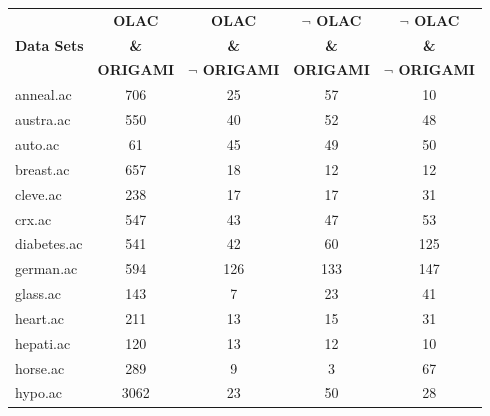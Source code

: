 \begin{table}[htbp]
	\centering
		\begin{tabular}{|l|c|c|c|c|}
		\hline
				& \textbf{OLAC}		& \textbf{OLAC}			& \textbf{$\neg$ OLAC}	& \textbf{$\neg$ OLAC}	\\
		\textbf{Data Sets}	& \textbf{\&}		& \textbf{\&}			& \textbf{\&}			& \textbf{\&}			\\
				& \textbf{ORIGAMI}	& \textbf{$\neg$ ORIGAMI}	& \textbf{ORIGAMI}		& \textbf{$\neg$ ORIGAMI}	\\
		\hline
		anneal.ac       & 706           & 25                 & 57                       & 10                            \\
		\hline
		austra.ac       & 550           & 40                 & 52                       & 48                            \\
		\hline
		auto.ac         & 61            & 45                 & 49                       & 50                            \\
		\hline
		breast.ac       & 657           & 18                 & 12                       & 12                            \\
		\hline
		cleve.ac        & 238           & 17                 & 17                       & 31                            \\
		\hline
		crx.ac          & 547           & 43                 & 47                       & 53                            \\
		\hline
		diabetes.ac     & 541           & 42                 & 60                       & 125                           \\
		\hline
		german.ac       & 594           & 126                & 133                      & 147                           \\
		\hline
		glass.ac        & 143           & 7                  & 23                       & 41                            \\
		\hline
		heart.ac        & 211           & 13                 & 15                       & 31                            \\
		\hline
		hepati.ac       & 120           & 13                 & 12                       & 10                            \\
		\hline
		horse.ac        & 289           & 9                  & 3                        & 67                            \\
		\hline
		hypo.ac         & 3062          & 23                 & 50                       & 28                            \\

\end{tabular}
\end{table}
